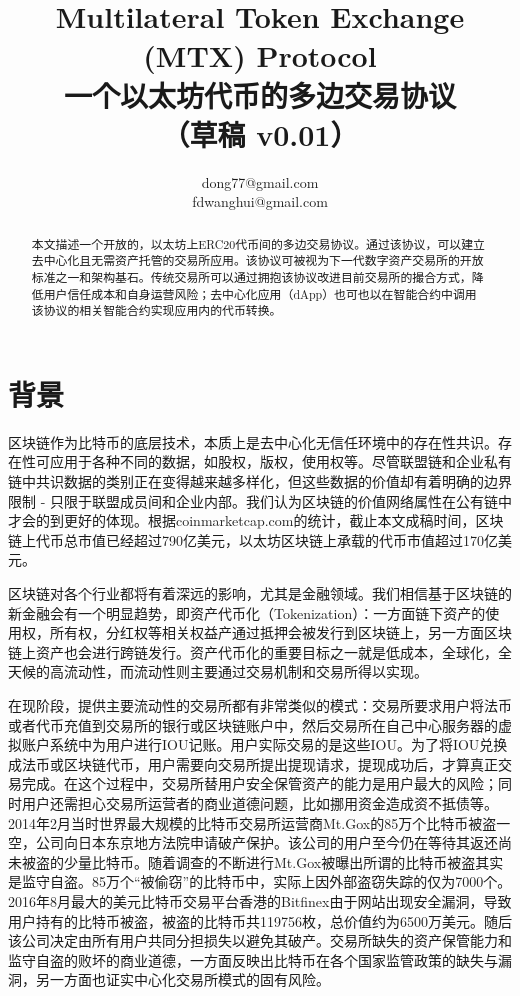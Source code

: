 \documentclass[UTF8,nofonts]{ctexart}
\title{Multilateral Token Exchange (MTX) Protocol\\一个以太坊代币的多边交易协议\\（草稿 v0.01）}
\author{ 
    dong77@gmail.com\\
    fdwanghui@gmail.com    %
}
\begin{document}
\maketitle

\begin{abstract}
本文描述一个开放的，以太坊上ERC20代币间的多边交易协议。通过该协议，可以建立去中心化且无需资产托管的交易所应用。该协议可被视为下一代数字资产交易所的开放标准之一和架构基石。传统交易所可以通过拥抱该协议改进目前交易所的撮合方式，降低用户信任成本和自身运营风险；去中心化应用（dApp）也可也以在智能合约中调用该协议的相关智能合约实现应用内的代币转换。

\end{abstract}

\newpage

\tableofcontents
\newpage

\section{背景\label{sec:background}}

区块链作为比特币的底层技术，本质上是去中心化无信任环境中的存在性共识。存在性可应用于各种不同的数据，如股权，版权，使用权等。尽管联盟链和企业私有链中共识数据的类别正在变得越来越多样化，但这些数据的价值却有着明确的边界限制 - 只限于联盟成员间和企业内部。我们认为区块链的价值网络属性在公有链中才会的到更好的体现。根据coinmarketcap.com的统计，截止本文成稿时间，区块链上代币总市值已经超过790亿美元，以太坊区块链上承载的代币市值超过170亿美元。

区块链对各个行业都将有着深远的影响，尤其是金融领域。我们相信基于区块链的新金融会有一个明显趋势，即资产代币化（Tokenization）：一方面链下资产的使用权，所有权，分红权等相关权益产通过抵押会被发行到区块链上，另一方面区块链上资产也会进行跨链发行。资产代币化的重要目标之一就是低成本，全球化，全天候的高流动性，而流动性则主要通过交易机制和交易所得以实现。

在现阶段，提供主要流动性的交易所都有非常类似的模式：交易所要求用户将法币或者代币充值到交易所的银行或区块链账户中，然后交易所在自己中心服务器的虚拟账户系统中为用户进行IOU记账。用户实际交易的是这些IOU。为了将IOU兑换成法币或区块链代币，用户需要向交易所提出提现请求，提现成功后，才算真正交易完成。在这个过程中，交易所替用户安全保管资产的能力是用户最大的风险；同时用户还需担心交易所运营者的商业道德问题，比如挪用资金造成资不抵债等。2014年2月当时世界最大规模的比特币交易所运营商Mt.Gox的85万个比特币被盗一空，公司向日本东京地方法院申请破产保护。该公司的用户至今仍在等待其返还尚未被盗的少量比特币。随着调查的不断进行Mt.Gox被曝出所谓的比特币被盗其实是监守自盗。85万个“被偷窃”的比特币中，实际上因外部盗窃失踪的仅为7000个。2016年8月最大的美元比特币交易平台香港的Bitfinex由于网站出现安全漏洞，导致用户持有的比特币被盗，被盗的比特币共119756枚，总价值约为6500万美元。随后该公司决定由所有用户共同分担损失以避免其破产。交易所缺失的资产保管能力和监守自盗的败坏的商业道德，一方面反映出比特币在各个国家监管政策的缺失与漏洞，另一方面也证实中心化交易所模式的固有风险。
\end{document}
